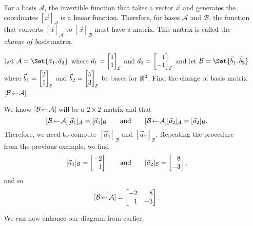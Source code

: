 For a basis $\mathcal A$, the invertible function that takes a vector $\vec x$ and generates the coordinates $[\vec x]_{\mathcal A}$
is a linear function. Therefore, for bases $\mathcal A$ and $\mathcal B$, the function that converts $[\vec x]_{\mathcal A}$ to $[\vec x]_{\mathcal B}$
must have a matrix. This matrix is called the \emph{change of basis} matrix.


\begin{example}
	Let $\mathcal A=\Set{\vec a_1,\vec a_2}$ where $\vec a_1=\mat{1\\1}_{\mathcal E}$ and $\vec a_2=\mat{1\\-1}_{\mathcal E}$ and let
	$\mathcal B=\Set{\vec b_1,\vec b_2}$ where $\vec b_1=\mat{2\\1}_{\mathcal E}$ and $\vec b_2=\mat{5\\3}_{\mathcal E}$ be bases for $\R^2$.
	Find the change of basis matrix $\BasisChange{\mathcal A}{\mathcal B}$.

	We know $\BasisChange{\mathcal A}{\mathcal B}$ will be a $2\times 2$ matrix and that
	\[
		\BasisChange{\mathcal A}{\mathcal B}[\vec a_1]_{\mathcal A}=[\vec a_1]_{\mathcal B}\qquad
		\text{and}\qquad
		\BasisChange{\mathcal A}{\mathcal B}[\vec a_2]_{\mathcal A}=[\vec a_2]_{\mathcal B}.
	\]
	Therefore, we need to compute $[\vec a_1]_{\mathcal B}$ and $[\vec a_2]_{\mathcal B}$. Repeating the procedure from the previous example,
	we find
	\[
		[\vec a_1]_{\mathcal B}=\mat{-2\\1}\qquad \text{and}\qquad [\vec a_2]_{\mathcal B}=\mat{8\\-3},
	\]
	and so
	\[
		\BasisChange{\mathcal A}{\mathcal B}=\mat{-2&8\\1&-3}.
	\]
\end{example}

We can now enhance our diagram from earlier.

\begin{center}
\end{center}

